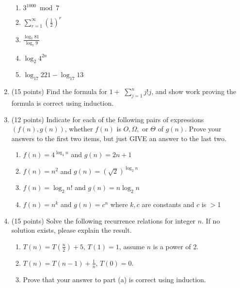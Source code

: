 \documentclass[12pt]{article}
\begin{document}
\begin{enumerate}
\begin{enumerate}
\item $3^{1000} \bmod 7$

\item $\sum_{r=1}^\infty(\frac{1}{2})^r$

\item $\frac{\log_7 81}{\log_7 9}$

\item $\log_2 4^{2n}$

\item $\log_{17} 221 - \log_{17} 13$

\end{enumerate}

\item (15 points) Find the formula for $1+$ $\displaystyle\sum_{j=1}^n j!j $, and
    show work proving the formula is correct using induction.

\item (12 points) Indicate for each of the following pairs of expressions
    $(f(n),g(n))$, whether $f(n)$ is  $O, \Omega,$ or $\Theta$ of $g(n)$.  Prove
    your answers to the first two items, but just GIVE an answer to the last
    two.

\begin{enumerate}

\item $f(n)=4^{\log_{4} n}$ and $g(n)=2n+1$

\item $f(n)= n^2$ and $g(n)=(\sqrt{2})^{\log_2 n}$

\item $f(n) =\log_2 n!$ and $g(n) =n \log_2 n$

\item $f(n) = n^k$ and $g( n)=c^n$ where $k,c$ are constants and $c$ is $>$1

\end{enumerate}

\newpage

\item (15 points) Solve the following recurrence relations for integer $n$. If no
    solution exists, please explain the result.

\begin{enumerate}

\item $T(n)=T(\frac{n}{2}) + 5$, $T(1) = 1$, assume $n$ is a power of 2.

\item $T(n)= T(n-1) + \frac{1}{n}$, $T(0) = 0$.

\item Prove that your answer to part (a) is correct using induction.


\end{enumerate}
\end{enumerate}
\end{document}
